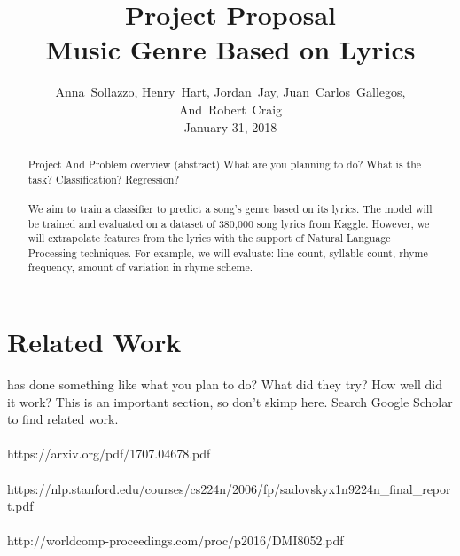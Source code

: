 \documentclass[journal]{IEEEtran}
\begin{document}
\title{Project Proposal\\Music Genre Based on Lyrics}

\author{Anna~Sollazzo,
        Henry~Hart,
        Jordan~Jay,
        Juan~Carlos~Gallegos,
        And~Robert~Craig \\ January 31, 2018}
        
\maketitle


\begin{abstract}

Project And Problem overview (abstract) What are you planning to do?  What is the task? Classification? Regression? \\ \\ We aim to train a classifier to predict a song's genre based on its lyrics. The model will be trained and evaluated on a dataset of 380,000 song lyrics from Kaggle. However, we will extrapolate features from the lyrics with the support of Natural Language Processing techniques. For example, we will evaluate: line count, syllable count, rhyme frequency, amount of variation in rhyme scheme.

\end{abstract}


\section{Related Work}

 has done something like what you plan to do?  What did they try?  How well did it work? This is an important section, so don't skimp here. Search Google Scholar to find related work. \\\\https://arxiv.org/pdf/1707.04678.pdf \\ \\ https://nlp.stanford.edu/courses/cs224n/2006/fp/sadovsky\-x1n9\-224n\_final\_report.pdf \\ \\ http://worldcomp-proceedings.com/proc/p2016/DMI8052.pdf\\
\end{document}
